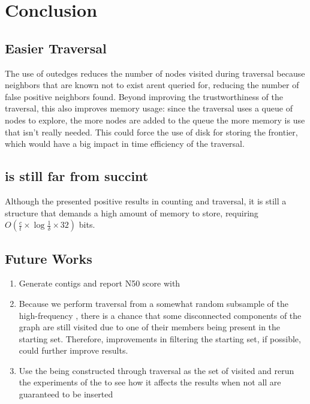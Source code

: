 \chapter{Conclusion}

\section{Easier Traversal}

The use of outedges reduces the number of nodes visited during traversal because neighbors that are known not to exist arent queried for, reducing the number of false positive neighbors found. Beyond improving the trustworthiness of the traversal, this also improves memory usage: since the traversal uses a queue of nodes to explore, the more nodes are added to the queue the more memory is use that isn't really needed. This could force the use of disk for storing the frontier, which would have a big impact in time efficiency of the traversal.

\section{\dBCM is still far from succint}

Although the \dBCM presented positive results in counting and traversal, it is still a structure that demands a high amount of memory to store, requiring $O(\frac{c}{t} \times \log \frac{1}{\delta} \times 32)$ bits.

\section{Future Works}

\begin{enumerate}
\item Generate contigs and report N50 score with \dBHT
\item Because we perform traversal from a somewhat random subsample of the high-frequency , there is a chance that some disconnected components of the graph are still visited due to one of their members being present in the starting set. Therefore, improvements in filtering the starting set, if possible, could further improve results.
\item Use the \dBHT being constructed through traversal as the set of visited  and rerun the experiments of the \dBHT to see how it affects the results when not all  are guaranteed to be inserted
\end{enumerate}